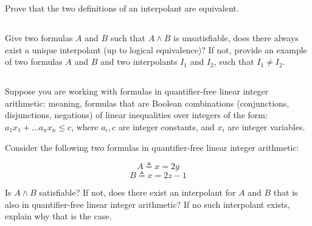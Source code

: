 \documentclass[11pt, oneside]{article}   	%
\begin{document}
Prove that the two definitions of an interpolant are equivalent.

\subsection{}
Give two formulas $A$ and $B$ such that $A\land B$ is unsatisfiable,
does there always exist a unique interpolant (up to logical equivalence)?
If not, provide an example of two formulas $A$ and $B$ and
two interpolants $I_1$ and $I_2$,
such that $I_1 \neq I_2$.


\subsection{}
Suppose you are working with formulas
in quantifier-free linear integer arithmetic:
meaning, formulas that are Boolean combinations (conjunctions, disjunctions, negations)
of linear inequalities over integers
of the form: $a_1x_1 + \ldots a_nx_n \leq c$,
where $a_i,c$ are integer constants, and $x_i$ are integer
variables.

Consider the following two formulas in quantifier-free
linear integer arithmetic:

$$A \triangleq x = 2y$$
$$B \triangleq x = 2z - 1$$

Is $A \land B$ satisfiable?
If not, does there exist an interpolant
for $A$ and $B$ that is also in quantifier-free linear integer arithmetic?
If no such interpolant exists, explain why that is the case.






\end{document}
